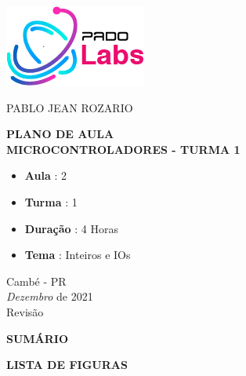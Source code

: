 \documentclass[12pt,a4paper]{report}
\begin{document}
%
%
\thispagestyle{empty}

\begin{center}
    \includegraphics[scale=0.7]{fig/logo.png}

    \vspace{.7cm}

    {\Large \uppercase{Pablo Jean Rozario}}

    \vspace{3cm}

    \Large \MakeUppercase{\textbf{PLANO DE AULA \\
            Microcontroladores - Turma 1 }}

    \vspace{3cm}

    \normalsize

    \begin{itemize}
        \item \textbf{Aula} : 2
        \item \textbf{Turma} : 1
        \item \textbf{Duração} : 4 Horas
        \item \textbf{Tema} : Inteiros e IOs
    \end{itemize}

    \vspace{3cm}

    Cambé - PR \\ \textit{Dezembro} de 2021 \\ Revisão \Revisao
\end{center}

\newpage


\thispagestyle{empty}
\mbox{}
\newpage

%
%

\begingroup
\let\clearpage\relax
\newpage
\begin{center}
    \MakeUppercase{\bf Sumário}
\end{center}
\tableofcontents
\thispagestyle{empty}

\newpage
\begin{center}
    \MakeUppercase{\bf Lista de Figuras}
\end{center}
\listoffigures
\thispagestyle{empty}
\end{document}
